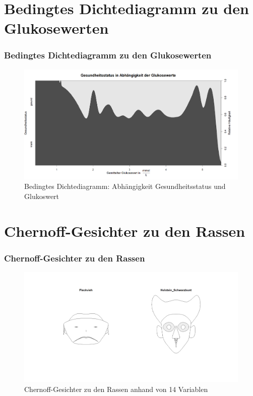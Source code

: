 \documentclass{beamer}
\begin{document}
		\section{Bedingtes Dichtediagramm zu den Glukosewerten}
	\begin{frame}
		\frametitle{Bedingtes Dichtediagramm zu den Glukosewerten}
		\begin{figure}[h]
			\centering
			\includegraphics[scale=0.33]{Bedingtes Dichtediagramm.png}
			\vspace{-0.6cm}
			\caption{Bedingtes Dichtediagramm: Abhängigkeit Gesundheitsstatus  und Glukoswert}
		\end{figure}
	\end{frame}
	\section{Chernoff-Gesichter zu den Rassen}
	\begin{frame}
		\frametitle{Chernoff-Gesichter zu den Rassen}
	\begin{figure}[h]
		\centering
		\includegraphics[width=1\textwidth]{Chernoff-Gesichter.png}
		\vspace{-0.6cm}
		\caption{Chernoff-Gesichter zu den Rassen anhand von 14 Variablen}
	\end{figure}
	\end{frame}
	
\end{document}
